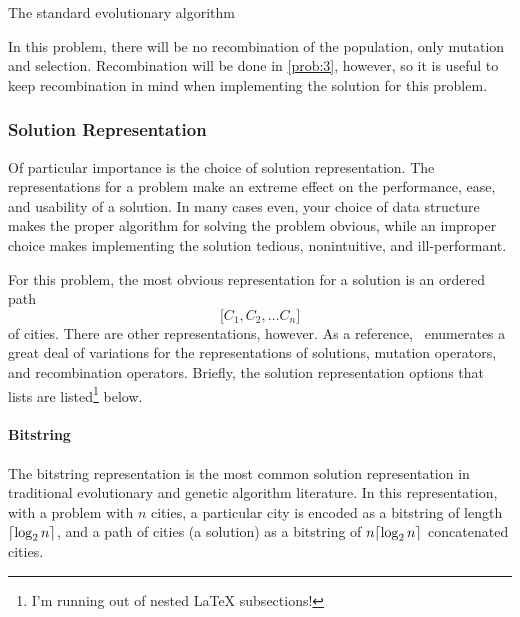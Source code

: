 \documentclass{article}
\begin{document}
\begin{algorithm}[h]
    \begin{algorithmic}
            \EndWhile{}
            \State{}
        \EndFunction{}
    \end{algorithmic}
    \caption{The standard evolutionary algorithm}\label{alg:standard-ea}
\end{algorithm}

In this problem, there will be no recombination of the population, only mutation and selection.
Recombination will be done in \autoref{prob:3}, however, so it is useful to keep recombination in
mind when implementing the solution for this problem.

\subsubsection{Solution Representation}
Of particular importance is the choice of solution representation. The representations for a
problem make an extreme effect on the performance, ease, and usability of a solution. In many cases
even, your choice of data structure makes the proper algorithm for solving the problem obvious,
while an improper choice makes implementing the solution tedious, nonintuitive, and ill-performant.

For this problem, the most obvious representation for a solution is an ordered path
\[\lbrack C_1, C_2, \dots C_n \rbrack \]
of cities. There are other representations, however. As a reference,~\cite{tsp_ea} enumerates a
great deal of variations for the representations of solutions, mutation operators, and
recombination operators. Briefly, the solution representation options that~\cite{tsp_ea} lists are
listed\footnote{I'm running out of nested \LaTeX{} subsections!} below.

\paragraph{Bitstring}
The bitstring representation is the most common solution representation in traditional evolutionary
and genetic algorithm literature. In this representation, with a problem with $n$ cities, a
particular city is encoded as a bitstring of length $\ceil*{\log_2 n}$, and a path of cities (a
solution) as a bitstring of $n\ceil*{\log_2 n}$ concatenated cities.
\end{document}
